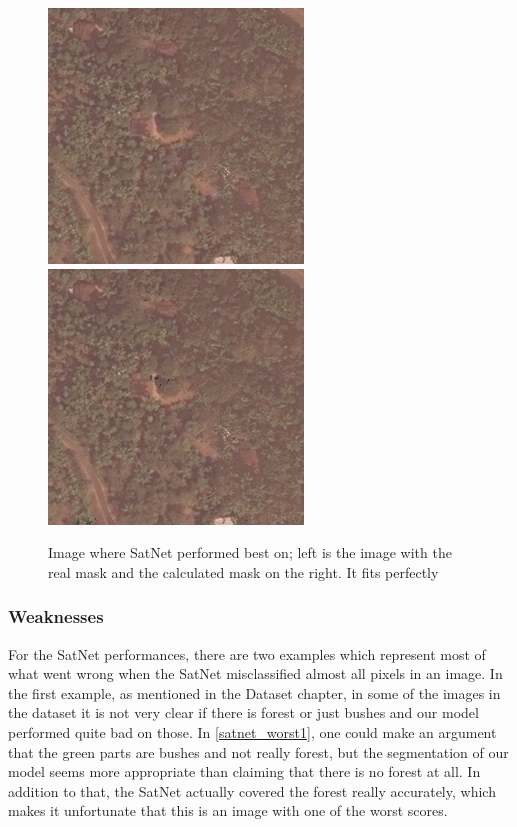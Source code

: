 \begin{figure}[!h]
  \begin{center}
  \label{satnet_best}
  \includegraphics[width=.4\linewidth]{images/satellite_images/sat_best_real}
  \includegraphics[width=.4\linewidth]{images/satellite_images/sat_best_calc}
  \caption{Image where SatNet performed best on; left is the image with the real mask and the calculated mask on the right. It fits perfectly}
  \end{center}
\end{figure}

\subsubsection{Weaknesses}

For the SatNet performances, there are two examples which represent most of what went wrong when the SatNet misclassified almost all pixels in an image. In the first example, as mentioned in the Dataset chapter, in some of the images in the dataset it is not very clear if there is forest or just bushes and our model performed quite bad on those. In \ref{satnet_worst1}, one could make an argument that the green parts are bushes and not really forest, but the segmentation of our model seems more appropriate than claiming that there is no forest at all. In addition to that, the SatNet actually covered the forest really accurately, which makes it unfortunate that this is an image with one of the worst scores.

